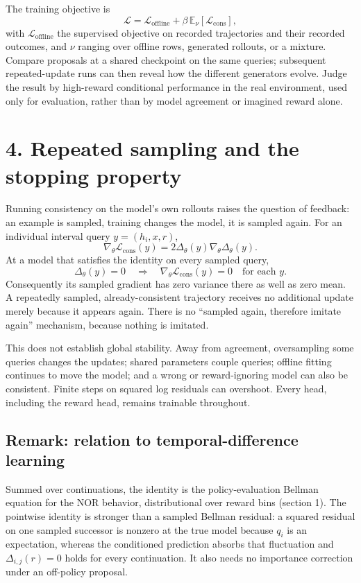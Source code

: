 \documentclass{article}
\begin{document}
The training objective is
\[
\mathcal L
=\mathcal L_{\mathrm{offline}}
+\beta\,\mathbb E_{\nu}[\mathcal L_{\mathrm{cons}}],
\]
with $\mathcal L_{\mathrm{offline}}$ the supervised objective on recorded trajectories and their recorded
outcomes, and $\nu$ ranging over offline rows, generated rollouts, or a mixture. Compare proposals at a
shared checkpoint on the same queries; subsequent repeated-update runs can then reveal how the different
generators evolve. Judge the result by high-reward conditional performance in the real environment, used
only for evaluation, rather than by model agreement or imagined reward alone.

\section*{4. Repeated sampling and the stopping property}

Running consistency on the model's own rollouts raises the question of feedback: an example is sampled,
training changes the model, it is sampled again. For an individual interval query $y=(h_i,x,r)$,
\[
\nabla_\theta\mathcal L_{\mathrm{cons}}(y)
=2\Delta_\theta(y)\nabla_\theta\Delta_\theta(y).
\]
At a model that satisfies the identity on every sampled query,
\[
\Delta_\theta(y)=0
\quad\Longrightarrow\quad
\nabla_\theta\mathcal L_{\mathrm{cons}}(y)=0
\quad\text{for each }y.
\]
Consequently its sampled gradient has zero variance there as well as zero mean. A repeatedly sampled,
already-consistent trajectory receives no additional update merely because it appears again. There is no
``sampled again, therefore imitate again'' mechanism, because nothing is imitated.

This does not establish global stability. Away from agreement, oversampling some queries changes the
updates; shared parameters couple queries; offline fitting continues to move the model; and a wrong or
reward-ignoring model can also be consistent. Finite steps on squared log residuals can overshoot. Every
head, including the reward head, remains trainable throughout.

\subsection*{Remark: relation to temporal-difference learning}

Summed over continuations, the identity is the policy-evaluation Bellman equation for the NOR behavior,
distributional over reward bins (section 1). The pointwise identity is stronger than a sampled Bellman
residual: a squared residual on one sampled successor is nonzero at the true model because $q_i$ is an
expectation, whereas the conditioned prediction absorbs that fluctuation and $\Delta_{i,j}(r)=0$ holds for
every continuation. It also needs no importance correction under an off-policy proposal.
\end{document}

